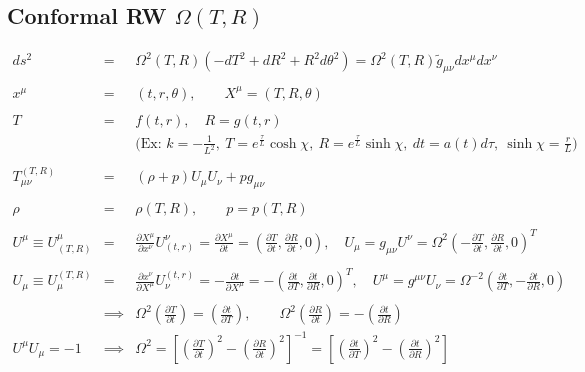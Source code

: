 \documentclass[10pt,letterpaper]{article}
\numberwithin{equation}{section}
\begin{document}
\subsection{Conformal RW $\Omega(T,R)$}
\begin{eqnarray}
ds^2 &=& \Omega^2(T,R)\left( -dT^2 + dR^2 + R^2 d\theta^2\right) 
=\Omega^2(T,R) \tilde g_{\mu\nu} dx^\mu dx^\nu
\\ \nonumber\\
x^\mu &=& (t,r,\theta),\qquad X^\mu = (T,R,\theta)
\\\nonumber\\
T &=& f(t,r),\quad R = g(t,r)
\nonumber\\
&& \text{(Ex: } k=-\tfrac{1}{L^2},\ T = e^{\tfrac\tau L}\cosh \chi,\  R = e^{\tfrac\tau L} \sinh\chi,\  dt=a(t)d\tau,\ \sinh\chi = \tfrac{r}{L})
\\ \nonumber\\
T_{\mu\nu}^{(T,R)} &=& (\rho+p)U_\mu U_\nu + p g_{\mu\nu}
\\ \nonumber\\
\rho &=& \rho(T,R),\qquad p = p(T,R)
\\\nonumber\\
U^\mu \equiv U^\mu_{(T,R)} &=& \frac{\partial X^\mu}{\partial x^\nu}U^\nu_{(t,r)} =  \frac{\partial X^\mu}{\partial t} = \left( \frac{\partial T}{\partial t},\frac{\partial R}{\partial t},0\right),\quad U_\mu = g_{\mu\nu}U^\nu= \Omega^2 \left(-\frac{\partial T}{\partial t}, \frac{\partial R}{\partial t},0\right)^T
\\ \nonumber\\
U_\mu \equiv U_\mu^{(T,R)} &=& \frac{\partial x^\nu}{\partial X^\mu}U_\nu^{(t,r)} =  -\frac{\partial t}{\partial X^\mu} = -\left( \frac{\partial t}{\partial T},\frac{\partial t}{\partial R},0\right)^T,\quad U^\mu = g^{\mu\nu}U_\nu= \Omega^{-2} \left(\frac{\partial t}{\partial T}, -\frac{\partial t}{\partial R},0\right)
\\ \nonumber\\
&\implies& \Omega^2 \left(\frac{\partial T}{\partial t}\right) = \left(\frac{\partial t}{\partial T}\right),\qquad \Omega^2\left(\frac{\partial R}{\partial t}\right) =-\left(\frac{\partial t}{\partial R}\right)
\nonumber\\
U^\mu U_\mu = -1&\implies& \boxed{\Omega^2 =  \left[ \left(\frac{\partial T}{\partial t}\right)^2 - \left(\frac{\partial R}{\partial t}\right)^2\right]^{-1} =  \left[ \left(\frac{\partial t}{\partial T}\right)^2 - \left(\frac{\partial t}{\partial R}\right)^2\right]}

\end{eqnarray}
\end{document}
